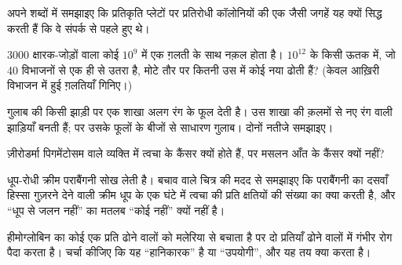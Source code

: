 \begin{exercise}[$\star\star$]\label{exo:g11:mutations:8}
अपने शब्दों में समझाइए कि प्रतिकृति प्लेटों पर प्रतिरोधी कॉलोनियों की एक
जैसी जगहें यह क्यों सिद्ध करती हैं कि वे  संपर्क से पहले हुए
थे।
\end{exercise}

\begin{exercise}[$\star\star$]\label{exo:g11:mutations:9}
\num{3000} क्षारक-जोड़ों वाला कोई  $10^9$  में एक
ग़लती के साथ नक़ल होता है। $10^{12}$  के किसी ऊतक में, जो 40
विभाजनों से एक ही  से उतरा है, मोटे तौर पर कितनी  उस  में
कोई नया  ढोती हैं? (केवल आख़िरी विभाजन में हुई ग़लतियाँ
गिनिए।)
\end{exercise}

\begin{exercise}[$\star\star$]\label{exo:g11:mutations:10}
गुलाब की किसी झाड़ी पर एक शाखा अलग रंग के फूल देती है। उस शाखा की क़लमों
से नए रंग वाली झाड़ियाँ बनती हैं; पर उसके फूलों के बीजों से साधारण गुलाब।
दोनों नतीजे समझाइए।
\end{exercise}

\begin{exercise}[$\star\star$]\label{exo:g11:mutations:11}
ज़ीरोडर्मा पिगमेंटोसम वाले व्यक्ति में त्वचा के कैंसर क्यों होते हैं, पर
मसलन आँत के कैंसर क्यों नहीं?
\end{exercise}

\begin{exercise}[$\star\star\star$]\label{exo:g11:mutations:12}
धूप-रोधी क्रीम पराबैंगनी सोख लेती है। बचाव वाले चित्र की मदद से समझाइए कि
पराबैंगनी का दसवाँ हिस्सा गुज़रने देने वाली क्रीम धूप के एक घंटे में त्वचा
की प्रति  क्षतियों की संख्या का क्या करती है, और ``धूप से जलन नहीं''
का मतलब ``कोई  नहीं'' क्यों नहीं है।
\end{exercise}

\begin{exercise}[$\star\star\star$]\label{exo:g11:mutations:13}
हीमोग्लोबिन  का कोई  एक प्रति ढोने वालों को मलेरिया से बचाता है
पर दो प्रतियाँ ढोने वालों में गंभीर रोग पैदा करता है। चर्चा कीजिए कि यह
 ``हानिकारक'' है या ``उपयोगी'', और यह तय क्या करता है।
\end{exercise}

